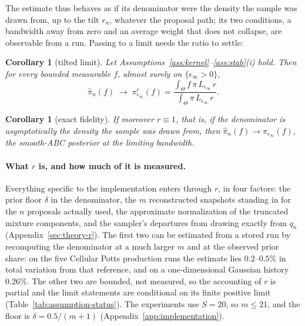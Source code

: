 \documentclass[10pt]{article}
\theoremstyle{plain}
\newtheorem{corollary}[theorem]{Corollary}
\theoremstyle{definition}
\begin{document}
The estimate thus behaves as if its denominator were the density the sample was drawn from, up to the tilt $r_n$, whatever the proposal path; its two conditions, a bandwidth away from zero and an average weight that does not collapse, are observable from a run. Passing to a limit needs the ratio to settle:

\begin{corollary}[tilted limit]\label{cor:tilt}
Let Assumptions~\ref{ass:kernel}--\ref{ass:stab}(i) hold. Then for every bounded measurable $f$, almost surely on $\{\epsilon_\infty>0\}$,
\begin{equation}
\widehat\pi_n(f)\;\longrightarrow\;\pi^{r}_{\epsilon_\infty}(f)=\frac{\int_\Theta f\,\pi\,L_{\epsilon_\infty}\,r}{\int_\Theta \pi\,L_{\epsilon_\infty}\,r}.
\label{eq:tilted-target}
\end{equation}
\end{corollary}

\begin{corollary}[exact fidelity]\label{cor:exact}
If moreover $r\equiv1$, that is, if the denominator is asymptotically the density the sample was drawn from, then $\widehat\pi_n(f)\to\pi_{\epsilon_\infty}(f)$, the smooth-ABC posterior at the limiting bandwidth.
\end{corollary}

\paragraph{What $r$ is, and how much of it is measured.} Everything specific to the implementation enters through $r$, in four factors: the prior floor $\delta$ in the denominator, the $m$ reconstructed snapshots standing in for the $n$ proposals actually used, the approximate normalization of the truncated mixture components, and the sampler's departures from drawing exactly from $q_n$ (Appendix~\ref{sec:theory-r}). The first two can be estimated from a stored run by recomputing the denominator at a much larger $m$ and at the observed prior share: on the five Cellular Potts production runs the estimate lies $0.2$--$0.5\%$ in total variation from that reference, and on a one-dimensional Gaussian history $0.26\%$. The other two are bounded, not measured, so the accounting of $r$ is partial and the limit statements are conditional on its finite positive limit (Table~\ref{tab:assumption-status}). The experiments use $S=20$, so $m\le21$, and the floor is $\delta=0.5/(m{+}1)$ (Appendix~\ref{app:implementation}).
\end{document}
